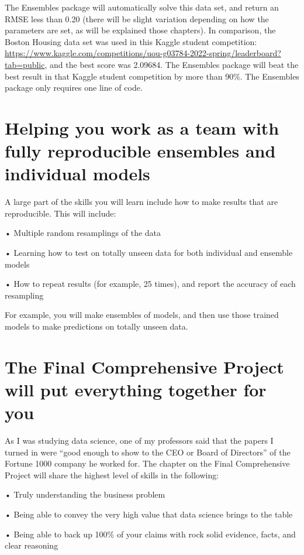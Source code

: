 \documentclass[
]{book}
\begin{document}
The Ensembles package will automatically solve this data set, and return an RMSE less than 0.20 (there will be slight variation depending on how the parameters are set, as will be explained those chapters). In comparison, the Boston Housing data set was used in this Kaggle student competition: \url{https://www.kaggle.com/competitions/uou-g03784-2022-spring/leaderboard?tab=public}, and the best score was 2.09684. The Ensembles package will beat the best result in that Kaggle student competition by more than 90\%. The Ensembles package only requires one line of code.

\section{Helping you work as a team with fully reproducible ensembles and individual models}\label{helping-you-work-as-a-team-with-fully-reproducible-ensembles-and-individual-models}

A large part of the skills you will learn include how to make results that are reproducible. This will include:

• Multiple random resamplings of the data

• Learning how to test on totally unseen data for both individual and ensemble models

• How to repeat results (for example, 25 times), and report the accuracy of each resampling

For example, you will make ensembles of models, and then use those trained models to make predictions on totally unseen data.

\section{The Final Comprehensive Project will put everything together for you}\label{the-final-comprehensive-project-will-put-everything-together-for-you}

As I was studying data science, one of my professors said that the papers I turned in were ``good enough to show to the CEO or Board of Directors'' of the Fortune 1000 company he worked for. The chapter on the Final Comprehensive Project will share the highest level of skills in the following:

• Truly understanding the business problem

• Being able to convey the very high value that data science brings to the table

• Being able to back up 100\% of your claims with rock solid evidence, facts, and clear reasoning
\end{document}
